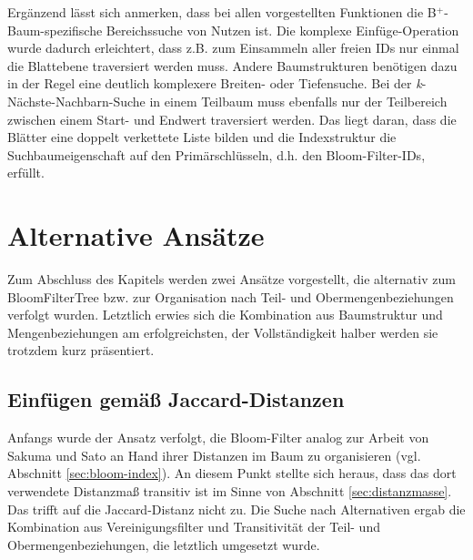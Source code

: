 Ergänzend lässt sich anmerken, dass bei allen vorgestellten Funktionen die B$^+$-Baum-spezifische Bereichssuche von Nutzen ist. Die komplexe Einfüge-Operation wurde dadurch erleichtert, dass z.B. zum Einsammeln aller freien IDs nur einmal die Blattebene traversiert werden muss. Andere Baumstrukturen benötigen dazu in der Regel eine deutlich komplexere Breiten- oder Tiefensuche. Bei der \textit{k}-Nächste-Nachbarn-Suche in einem Teilbaum muss ebenfalls nur der Teilbereich zwischen einem Start- und Endwert traversiert werden. Das liegt daran, dass die Blätter eine doppelt verkettete Liste bilden und die Indexstruktur die Suchbaumeigenschaft auf den Primärschlüsseln, d.h. den Bloom-Filter-IDs, erfüllt.  
\section{Alternative Ansätze}\label{sec:alternativen}
Zum Abschluss des Kapitels werden zwei Ansätze vorgestellt, die alternativ zum BloomFilterTree bzw. zur Organisation nach Teil- und Obermengenbeziehungen verfolgt wurden. Letztlich erwies sich die Kombination aus Baumstruktur und Mengenbeziehungen am erfolgreichsten, der Vollständigkeit halber werden sie trotzdem kurz präsentiert. 
\subsection{Einfügen gemäß Jaccard-Distanzen}\label{sec:ähnlichkeit}
Anfangs wurde der Ansatz verfolgt, die Bloom-Filter analog zur Arbeit von Sakuma und Sato an Hand ihrer Distanzen im Baum zu organisieren (vgl. Abschnitt \ref{sec:bloom-index}). An diesem Punkt stellte sich heraus, dass das dort verwendete Distanzmaß transitiv ist im Sinne von Abschnitt \ref{sec:distanzmasse}. Das trifft auf die Jaccard-Distanz nicht zu. Die Suche nach Alternativen ergab die Kombination aus Vereinigungsfilter und Transitivität der Teil- und Obermengenbeziehungen, die letztlich umgesetzt wurde. 
